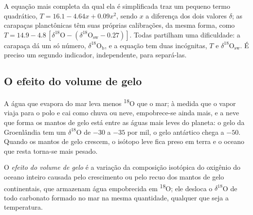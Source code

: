 A equação mais completa da qual ela é simplificada traz um pequeno termo quadrático,
$T = 16.1 - 4.64x + 0.09x^2$, sendo $x$ a diferença dos dois valores $\delta$; as carapaças planctônicas
têm suas próprias calibrações, da mesma forma, como $T = 14.9 - 4.8\,[\delta^{18}\mathrm{O} -
(\delta^{18}\mathrm{O}_{\mathrm{sw}} - 0.27)]$. Todas partilham uma dificuldade: a carapaça dá um só
número, $\delta^{18}\mathrm{O}_{\mathrm{b}}$, e a equação tem duas incógnitas, $T$ e
$\delta^{18}\mathrm{O}_{\mathrm{sw}}$. É preciso um segundo indicador, independente, para separá-las.

\subsection*{O efeito do volume de gelo}

A água que evapora do mar leva menos \textsuperscript{18}O que o mar; à medida que o vapor
viaja para o polo e cai como chuva ou neve, empobrece-se ainda mais, e a neve que forma os mantos
de gelo está entre as águas mais leves do planeta: o gelo da Groenlândia tem um $\delta^{18}$O de $-30$ a $-35$
por mil, o gelo antártico chega a $-50$. Quando os mantos de gelo crescem, o isótopo leve fica preso em terra
e o oceano que resta torna-se mais pesado.

\begin{definition}\label{def:b2:climate-proxies:ice-volume}
O \emph{efeito do volume de gelo} é a variação da composição isotópica do
oxigênio do oceano inteiro causada pelo crescimento ou pelo recuo dos mantos de gelo continentais, que
armazenam água empobrecida em \textsuperscript{18}O; ele desloca o $\delta^{18}$O de todo carbonato
formado no mar na mesma quantidade, qualquer que seja a temperatura.
\end{definition}

